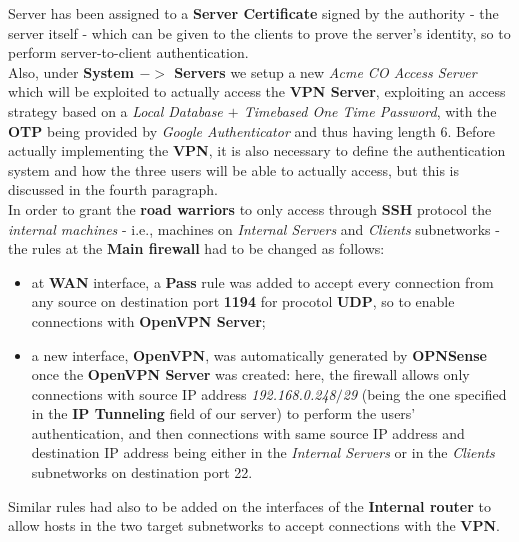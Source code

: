 Server has been assigned to a \textbf{Server Certificate} signed by the authority - the server itself - which can be given to the clients to prove the server's identity, so to perform server-to-client authentication.\\
Also, under \textbf{System $->$ Servers} we setup a new \textit{Acme CO Access Server} which will be exploited to actually access the \textbf{VPN Server}, exploiting an access strategy based on a \textit{Local Database $+$ Timebased One Time Password}, with the  \textbf{OTP} being provided by \textit{Google Authenticator} and thus having length 6. Before actually implementing the \textbf{VPN}, it is also necessary to define the authentication system and how the three users will be able to actually access, but this is discussed in the fourth paragraph.\\
In order to grant the \textbf{road warriors} to only access through \textbf{SSH} protocol the \textit{internal machines} - i.e., machines on \textit{Internal Servers} and \textit{Clients} subnetworks - the rules at the \textbf{Main firewall} had to be changed as follows:\\
\begin{itemize}
\item at \textbf{WAN} interface, a \textbf{Pass} rule was added to accept every connection from any source on destination port \textbf{1194} for procotol \textbf{UDP}, so to enable connections with \textbf{OpenVPN Server};
\item a new interface, \textbf{OpenVPN}, was automatically generated by \textbf{OPNSense} once the \textbf{OpenVPN Server} was created: here, the firewall allows only connections with source IP address \textit{192.168.0.248$/$29} (being the one specified in the \textbf{IP Tunneling} field of our server) to perform the users' authentication, and then connections with same source IP address and destination IP address being either in the \textit{Internal Servers} or in the \textit{Clients} subnetworks on destination port 22.
\end{itemize}

Similar rules had also to be added on the interfaces of the \textbf{Internal router} to allow hosts in the two target subnetworks to accept connections with the \textbf{VPN}.
